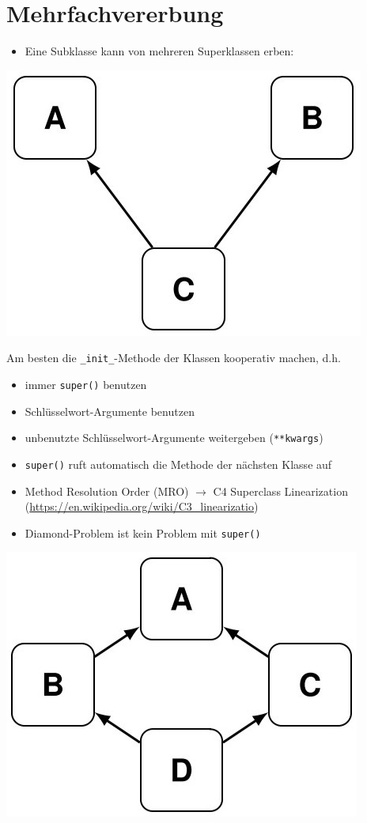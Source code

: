 \section{Mehrfachvererbung}
\begin{itemize}
	\item Eine Subklasse kann von mehreren Superklassen erben:
\end{itemize}
\begin{multicols}{2}

\includegraphics[width=0.7\linewidth]{images/v7_vererbung2}
\end{multicols}
Am besten die \texttt{\_init\_\(\)}-Methode der Klassen kooperativ machen, d.h.
\begin{itemize}
	\item immer \texttt{super()} benutzen
	\item Schlüsselwort-Argumente benutzen
	\item unbenutzte Schlüsselwort-Argumente weitergeben (\texttt{**kwargs})
\end{itemize}

\begin{multicols}{2}
\begin{itemize}
	\item \texttt{super()} ruft automatisch die Methode der nächsten Klasse auf
	\item Method Resolution Order (MRO) $\rightarrow$ C4 Superclass Linearization (\url{https://en.wikipedia.org/wiki/C3_linearizatio})
	\item Diamond-Problem ist kein Problem mit \texttt{super()}
\end{itemize}
\includegraphics[width=0.5\linewidth]{images/v7_vererbung3}
\end{multicols}

